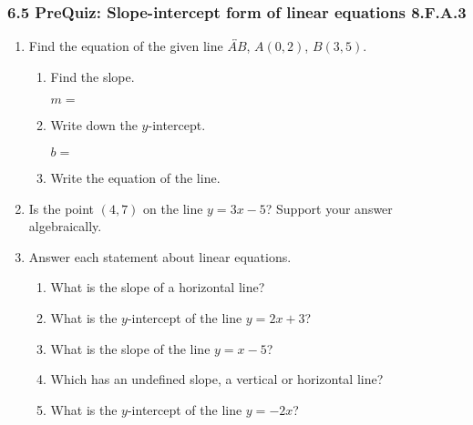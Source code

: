 

\fancyhead[LE]{\thepage}



\subsubsection*{6.5 PreQuiz: Slope-intercept form of linear equations \hfill 8.F.A.3}
\begin{enumerate}

\item Find the equation of the given line $\overleftrightarrow{AB}$, $A(0,2)$, $B(3,5)$.
\begin{multicols}{2}
    \begin{enumerate}[itemsep=0.5cm]
      \item Find the slope. \par
          $m=$
      \item Write down the $y$-intercept. \par 
        $b=$
      \item Write the equation of the line. \vspace{1cm}
      \end{enumerate}
    \begin{flushright}
    \end{flushright}
  \end{multicols}

\item Is the point $(4,7)$ on the line $y=3x-5$? Support your answer algebraically. \vspace{3cm}

\item Answer each statement about linear equations.
\begin{enumerate}[itemsep=0.25cm]
  \item What is the slope of a horizontal line?
  \item What is the $y$-intercept of the line $y = 2x + 3$?
  \item What is the slope of the line $y = x - 5$?
  \item Which has an undefined slope, a vertical or horizontal line?
  \item What is the $y$-intercept of the line $y = -2x$?
\end{enumerate} \vspace{0.5cm}


\end{enumerate}
